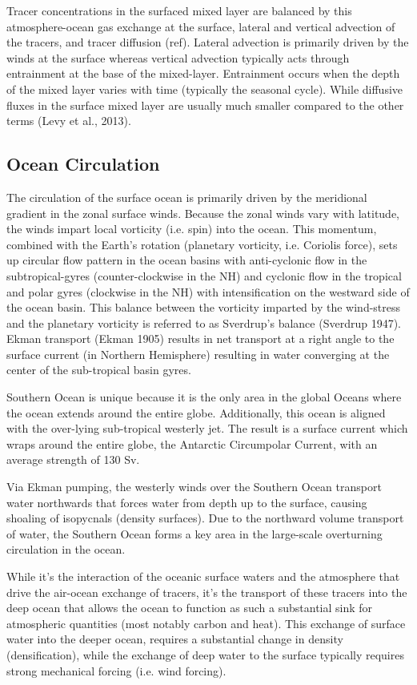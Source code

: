 Tracer concentrations in the surfaced mixed layer are balanced by this atmosphere-ocean gas exchange at the surface, lateral and vertical advection of the tracers, and tracer diffusion (ref). Lateral advection is primarily driven by the winds at the surface whereas vertical advection typically acts through entrainment at the base of the mixed-layer. Entrainment occurs when the depth of the mixed layer varies with time (typically the seasonal cycle). While diffusive fluxes in the surface mixed layer are usually much smaller compared to the other terms (Levy et al., 2013).

\subsection{Ocean Circulation }

The circulation of the surface ocean is primarily driven by the meridional gradient in the zonal surface winds. Because the zonal winds vary with latitude, the winds impart local vorticity (i.e. spin) into the ocean. This momentum, combined with the Earth's rotation (planetary vorticity, i.e. Coriolis force), sets up circular flow pattern in the ocean basins with anti-cyclonic flow in the subtropical-gyres (counter-clockwise in the NH) and cyclonic flow in the tropical and polar gyres (clockwise in the NH) with intensification on the westward side of the ocean basin.  This balance between the vorticity imparted by the wind-stress and the planetary vorticity is referred to as Sverdrup's balance (Sverdrup 1947).
Ekman transport (Ekman 1905) results in net transport at a right angle to the surface current (in Northern Hemisphere) resulting in water converging at the center of the sub-tropical basin gyres.

Southern Ocean is unique because it is the only area in the global Oceans where the ocean extends around the entire globe. Additionally, this ocean is aligned with the over-lying sub-tropical westerly jet. The result is a surface current which wraps around the entire globe, the Antarctic Circumpolar Current, with an average strength of 130 Sv.

Via Ekman pumping, the westerly winds over the Southern Ocean transport water northwards that forces water from depth up to the surface, causing shoaling of isopycnals (density surfaces). Due to the northward volume transport of water, the Southern Ocean forms a key area in the large-scale overturning circulation in the ocean.

While it's the interaction of the oceanic surface waters and the atmosphere that drive the air-ocean exchange of tracers, it's the transport of these tracers into the deep ocean that allows the ocean to function as such a substantial sink for atmospheric quantities (most notably carbon and heat). This exchange of surface water into the deeper ocean, requires a substantial change in density (densification), while the exchange of deep water to the surface typically requires strong mechanical forcing (i.e. wind forcing).

